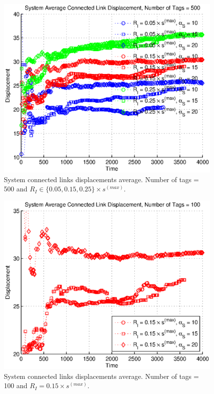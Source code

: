 \begin{figure}
\centering
\includegraphics[width=5in]{Chapter_4_Figures/sys_links_disp_500tags_all.eps}
\caption{System connected links displacements average. Number of tags = 500 and $R_I \in \{0.05, 0.15, 0.25\} \times s^{(max)}$.}
\label{Figure: sys_links_disp_500tags_all.eps}
\end{figure}
\begin{figure}
\centering
\includegraphics[width=5in]{Chapter_4_Figures/sys_links_disp_100tags_15diam.eps}
\caption{System connected links displacements average. Number of tags = 100 and $R_I = 0.15 \times s^{(max)}$.}
\label{Figure: sys_links_disp_100tags_15diam.eps}
\end{figure}
\clearpage

